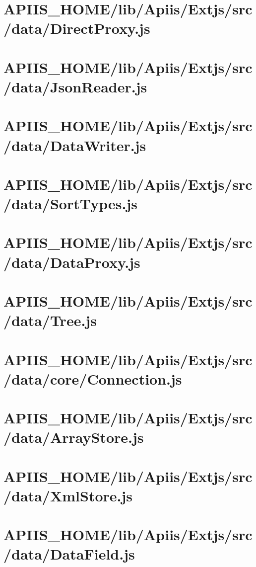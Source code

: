 \section{APIIS\_HOME/lib/Apiis/Extjs/src/data/DirectProxy.js} 
\section{APIIS\_HOME/lib/Apiis/Extjs/src/data/JsonReader.js} 
\section{APIIS\_HOME/lib/Apiis/Extjs/src/data/DataWriter.js} 
\section{APIIS\_HOME/lib/Apiis/Extjs/src/data/SortTypes.js} 
\section{APIIS\_HOME/lib/Apiis/Extjs/src/data/DataProxy.js} 
\section{APIIS\_HOME/lib/Apiis/Extjs/src/data/Tree.js} 
\section{APIIS\_HOME/lib/Apiis/Extjs/src/data/core/Connection.js} 
\section{APIIS\_HOME/lib/Apiis/Extjs/src/data/ArrayStore.js} 
\section{APIIS\_HOME/lib/Apiis/Extjs/src/data/XmlStore.js} 
\section{APIIS\_HOME/lib/Apiis/Extjs/src/data/DataField.js} 
